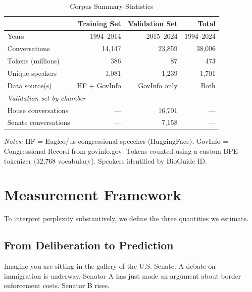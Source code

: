 \documentclass[12pt]{article}
\begin{document}
\begin{table}[H]
\centering
\caption{Corpus Summary Statistics}
\label{tab:corpus}
\begin{threeparttable}
\begin{tabular}{lrrr}
\toprule
& Training Set & Validation Set & Total \\
\midrule
Years & 1994--2014 & 2015--2024 & 1994--2024 \\
Conversations & 14,147 & 23,859 & 38,006 \\
Tokens (millions) & 386 & 87 & 473 \\
Unique speakers & 1,081 & 1,239 & 1,701 \\
Data source(s) & HF + GovInfo & GovInfo only & Both \\
\midrule
\multicolumn{4}{l}{\textit{Validation set by chamber}} \\
\quad House conversations & --- & 16,701 & --- \\
\quad Senate conversations & --- & 7,158 & --- \\
\bottomrule
\end{tabular}
\begin{tablenotes}[flushleft]
\small
\item \textit{Notes:} HF = Eugleo/us-congressional-speeches (HuggingFace). GovInfo = Congressional Record from govinfo.gov. Tokens counted using a custom BPE tokenizer (32,768 vocabulary). Speakers identified by BioGuide ID.
\end{tablenotes}
\end{threeparttable}
\end{table}


\section{Measurement Framework}

To interpret perplexity substantively, we define the three quantities we estimate.

\subsection{From Deliberation to Prediction}

Imagine you are sitting in the gallery of the U.S. Senate. A debate on immigration is underway. Senator A has just made an argument about border enforcement costs. Senator B rises.
\end{document}
